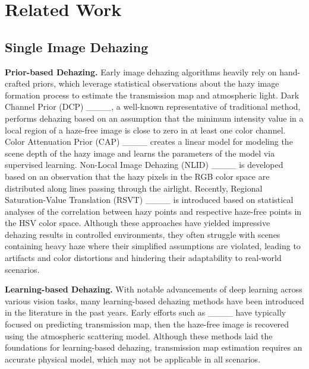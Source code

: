 \section{Related Work}
\label{sec:relatedwork}


\subsection{Single Image Dehazing}
\label{subsec:singleimagedehazing}


\textbf{Prior-based Dehazing.} Early image dehazing algorithms heavily rely on hand-crafted priors, which leverage statistical observations about the hazy image formation process to estimate the transmission map and atmospheric light. Dark Channel Prior (DCP) ____, a well-known representative of traditional method, performs dehazing based on an assumption that the minimum intensity value in a local region of a haze-free image is close to zero in at least one color channel. Color Attenuation Prior (CAP) ____ creates a linear model for modeling the scene depth of the hazy image and learns the parameters of the model via supervised learning. Non-Local Image Dehazing (NLID) ____ is developed based on an observation that the hazy pixels in the RGB color space are distributed along lines passing through the airlight. Recently, Regional Saturation-Value Translation (RSVT) ____ is introduced based on statistical analyses of the correlation between hazy points and respective haze-free points in the HSV color space. Although these approaches have yielded impressive dehazing results in controlled environments, they often struggle with scenes containing heavy haze where their simplified assumptions are violated, leading to artifacts and color distortions and hindering their adaptability to real-world scenarios.


\textbf{Learning-based Dehazing.} With notable advancements of deep learning across various vision tasks, many learning-based dehazing methods have been introduced in the literature in the past years. Early efforts such as ____ have typically focused on predicting transmission map, then the haze-free image is recovered using the atmospheric scattering model. Although these methods laid the foundations for learning-based dehazing, transmission map estimation requires an accurate physical model, which may not be applicable in all scenarios.

